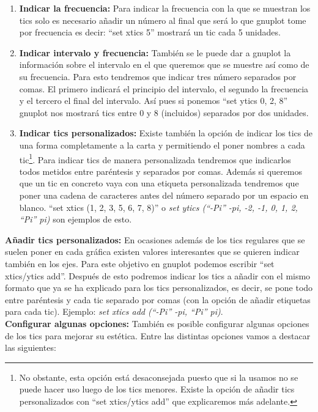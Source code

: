 \documentclass[11pt,a4paper,twoside,pdf]{article}
\numberwithin{equation}{section}
\begin{document}
\begin{enumerate}
	\item \textbf{Indicar la frecuencia:} Para indicar la frecuencia con la que se muestran los tics solo es necesario añadir un número al final que será lo que gnuplot tome por frecuencia es decir: ``set xtics 5'' mostrará un tic cada 5 unidades.
	\item \textbf{Indicar intervalo y frecuencia:} También se le puede dar a gnuplot la información sobre el intervalo en el que queremos que se muestre así como de su frecuencia. Para esto tendremos que indicar tres número separados por comas. El primero indicará el principio del intervalo, el segundo la frecuencia y el tercero el final del intervalo. Así pues si ponemos ``set ytics 0, 2, 8'' gnuplot nos mostrará tics entre $0$ y $8$ (incluidos) separados por dos unidades.
	\item \textbf{Indicar tics personalizados:} Existe también la opción de indicar los tics de una forma completamente a la carta y permitiendo el poner nombres a cada tic\footnote{No obstante, esta opción está desaconsejada puesto que si la usamos no se puede hacer uso luego de los tics menores. Existe la opción de añadir tics personalizados con ``set xtics/ytics add'' que explicaremos más adelante.}. Para indicar tics de manera personalizada tendremos que indicarlos todos metidos entre paréntesis y separados por comas. Además si queremos que un tic en concreto vaya con una etiqueta personalizada tendremos que poner una cadena de caracteres antes del número separado por un espacio en blanco. ``set xtics (1, 2, 3, 5, 6, 7, 8)'' o \textit{set ytics (``-Pi'' -pi, -2, -1, 0, 1, 2, ``Pi'' pi)} son ejemplos de esto.
\end{enumerate}

\textbf{Añadir tics personalizados:} En ocasiones además de los tics regulares que se suelen poner en cada gráfica existen valores interesantes que se quieren indicar también en los ejes. Para este objetivo en gnuplot podemos escribir ``set xtics/ytics add''. Después de esto podremos indicar los tics a añadir con el mismo formato que ya se ha explicado para los tics personalizados, es decir, se pone todo entre paréntesis y cada tic separado por comas (con la opción de añadir etiquetas para cada tic). Ejemplo: \textit{set xtics add (``-Pi'' -pi, ``Pi'' pi)}.\\

\textbf{Configurar algunas opciones:} También es posible configurar algunas opciones de los tics para mejorar su estética. Entre las distintas opciones vamos a destacar las siguientes:
\end{document}
